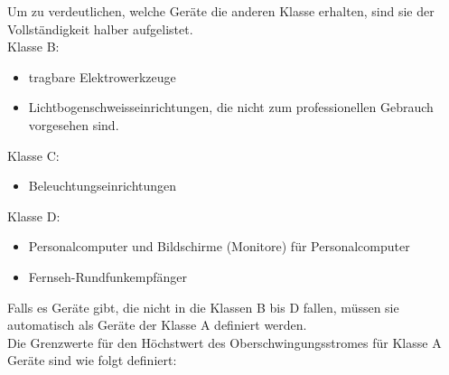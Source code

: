 \begin{appendix}
Um zu verdeutlichen, welche Geräte die anderen Klasse erhalten, sind sie der Vollständigkeit halber aufgelistet.\\
Klasse B:
\begin{itemize}
	\item tragbare Elektrowerkzeuge 	
	\item Lichtbogenschweisseinrichtungen, die nicht zum professionellen Gebrauch vorgesehen sind.
\end{itemize} 
Klasse C:
\begin{itemize}
	\item Beleuchtungseinrichtungen	
\end{itemize} 
Klasse D:
\begin{itemize}
	\item Personalcomputer und Bildschirme (Monitore) für Personalcomputer	
	\item Fernseh-Rundfunkempfänger
\end{itemize}

Falls es Geräte gibt, die nicht in die Klassen B bis D fallen, müssen sie automatisch als Geräte der Klasse A definiert werden.\\
Die Grenzwerte für den Höchstwert des Oberschwingungsstromes für Klasse A Geräte sind wie folgt definiert:


\end{appendix}
